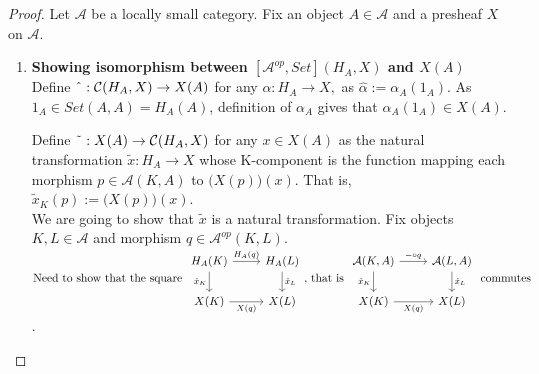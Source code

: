 \documentclass[a4paper]{article}
\theoremstyle{definition}
\begin{document}
		\begin{proof}\setcounter{equation}{0}
			Let $\mathcal{A} $ be a locally small category.
			Fix an object $A \in \mathcal{A} $ and a presheaf $X$ on $\mathcal{A}$.

			\begin{enumerate}[label=\Roman*]
				\item \textbf{Showing isomorphism between $[\mathcal{A}^{op},Set](H_A,X)$
					and $X(A)$}\\
					Define $\string ^ :\mathcal{C}(H_A,X) \to X(A) $
					for any $\alpha:H_A \to X,$ as  $\hat{\alpha}:= \alpha_A(1_A)$.
					As $1_A \in Set(A,A)=H_A(A)$,
					definition of $\alpha_A$ gives that $\alpha_A(1_A)\in X(A)$.

					Define $\string ~ : X(A) \to \mathcal{C}(H_A,X)$
					for any $ x \in X(A)$ as the natural transformation $\tilde{x} : H_A \to X$ whose
					K-component is the function mapping each morphism $p \in \mathcal{A}(K,A)$
					to $\Big(X(p)\Big)(x)$. That is, $\tilde{x}_K^{}
					(p):=\Big(X(p)\Big)(x)$.\\

					We are going to show that $\tilde{x}$ is a natural transformation.
					Fix objects $K,L \in \mathcal{A} $ and morphism $q \in \mathcal{A}^{op}(K,L)$.
					$\text{Need to show that the square }
					\begin{tikzcd}
						H_A(K) \arrow[swap]{d}{\tilde{x}_K} \arrow{r}{H_A(q)}
		& H_A(L) \arrow{d}{\tilde{x}_L}\\
		X(K) \arrow[swap]{r}{X(q)}
		& X(L)
					\end{tikzcd} \text{, that is }
					\begin{tikzcd}
						\mathcal{A}(K,A) \arrow[swap]{d}{\tilde{x}_K} \arrow{r}{ - \circ q}
		& \mathcal{A} (L,A) \arrow{d}{\tilde{x}_L}\\
		X(K) \arrow[swap]{r}{X(q)}
		& X(L)
					\end{tikzcd}\text{ commutes }$.\\


\end{enumerate}
\end{proof}
\end{document}
